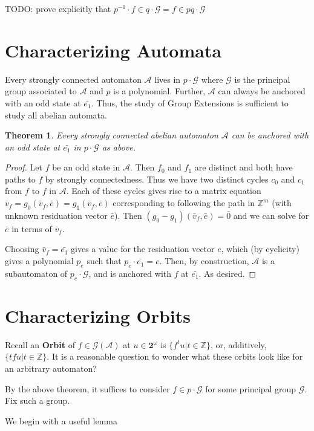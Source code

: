 \documentclass[12pt]{article}
\newcommand{\A}{\mathcal{A}}
\newcommand{\G}{\mathcal{G}}
\newcommand{\Z}{\mathbb{Z}}
\newcommand{\2}{\textbf{2}}
\renewcommand{\v}{\bar{v}}
\newtheorem{thm}{Theorem}
\begin{document}
TODO: prove explicitly that $p^{-1} \cdot f \in q \cdot \G = f \in pq \cdot \G$

\section{Characterizing Automata}
Every strongly connected automaton $\A$ lives in $p \cdot \G$ where 
$\G$ is the principal group associated to $\A$ and $p$ is a polynomial. 
Further, $\A$ can always be anchored with an odd state at $\bar{e_1}$. 
Thus, the study of Group Extensions is sufficient to study all abelian automata.

\begin{thm}
  Every strongly connected abelian automaton $\A$ can be anchored with an 
  odd state at $\bar{e_1}$ in $p \cdot \G$ as above.
\end{thm}

\begin{proof}
  Let $f$ be an odd state in $\A$. Then $f_0$ and $f_1$ are distinct
  and both have paths to $f$ by strongly connectedness. Thus we have two
  distinct cycles $c_0$ and $c_1$ from $f$ to $f$ in $\A$.
  Each of these cycles gives rise to a matrix equation 
  $\v_f = g_0(\v_f,\bar{e}) = g_1(\v_f,\bar{e})$ corresponding to following
  the path in $\Z^m$ (with unknown residuation vector $\bar{e}$). 
  Then $(g_0 - g_1)(\v_f, \bar{e}) = \bar{0}$ and we can solve for 
  $\bar{e}$ in terms of $\v_f$.

  Choosing $\v_f = \bar{e_1}$ gives a value for the residuation vector $e$,
  which (by cyclicity) gives a polynomial $p_e$ 
  such that $p_e \cdot \bar{e_1} = e$. Then, by construction, $\A$ is 
  a subautomaton of $p_e \cdot \G$, and is anchored with $f$ at $\bar{e_1}$.
  As desired.
\end{proof}

\section{Characterizing Orbits}

Recall an \textbf{Orbit} of $f \in \G(\A)$ at $u \in \2^{\omega}$
is $\{ f^t u | t \in \Z \}$, or, additively, $\{ tf u | t \in \Z \}$.
It is a reasonable question to wonder what these orbits look like
for an arbitrary automaton?

By the above theorem, it suffices to consider $f \in p \cdot \G$
for some principal group $\G$. Fix such a group.

We begin with a useful lemma
\end{document}
